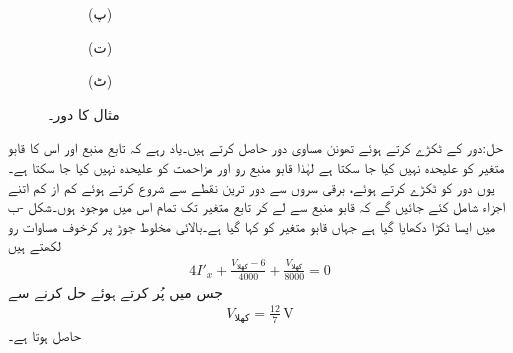 \begin{figure}
\begin{subfigure}{0.6\textwidth}
\begin{tikzpicture}
\end{tikzpicture}
\caption*{(پ)}
\end{subfigure}%
\begin{subfigure}{0.4\textwidth}
\centering
{}
\caption*{(ت)}
\end{subfigure}
\begin{subfigure}{0.5\textwidth}
\centering
{}
\caption*{(ٹ)}
\end{subfigure}%
\caption{مثال  کا دور۔}
\label{شکل_مسئلہ_تابع_غیر_تابع_مثال_الف}
\end{figure}

حل:دور کے ٹکڑے کرتے ہوئے تھونن مساوی دور حاصل کرتے ہیں۔یاد رہے کہ تابع منبع  اور اس کا قابو متغیر کو علیحدہ نہیں کیا جا سکتا ہے لہٰذا قابو منبع رو اور  مزاحمت کو علیحدہ نہیں کیا جا سکتا ہے۔یوں دور کو ٹکڑے کرتے ہوئے، برقی سروں سے دور ترین نقطے سے شروع کرتے ہوئے  کم از کم اتنے اجزاء شامل کئے جائیں گے کہ قابو منبع سے لے کر تابع متغیر تک تمام اس میں موجود ہوں۔شکل -ب میں ایسا ٹکڑا دکھایا گیا ہے جہاں قابو متغیر کو  کہا گیا ہے۔بالائی  مخلوط جوڑ پر کرخوف مساوات رو لکھتے ہیں
\begin{align*}
4 I'_x+\frac{V_{\text{کھلا}}-6}{4000}+\frac{V_{\text{کھلا}}}{8000}=0
\end{align*}
جس میں  پُر کرتے ہوئے حل کرنے سے 
\begin{align*}
V_{\text{کھلا}}=\frac{12}{7} \, \si{\volt}
\end{align*}
حاصل ہوتا ہے۔

